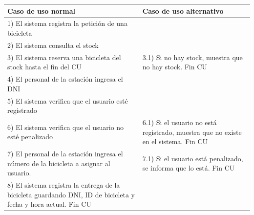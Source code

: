 \documentclass[a4paper, 10pt, twoside]{article}
\begin{document}
\begin{tabular}{| p{7cm} | p{7cm} |}
	\hline
	Caso de uso normal & Caso de uso alternativo \\ \hline
	1) El sistema registra la petición de una bicicleta &  \\ \hline
	2) El sistema consulta el stock & \\ \hline
	3) El sistema reserva una bicicleta del stock hasta el fin del CU & 3.1) Si no hay stock, muestra que no hay stock. Fin CU \\ \hline
	4) El personal de la estación ingresa el DNI & \\ \hline
	5) El sistema verifica que el usuario esté registrado & \\ \hline
	6) El sistema verifica que el usuario no esté penalizado & 6.1) Si el usuario no está registrado, muestra que no existe en el sistema. Fin CU \\ \hline
	7) El personal de la estación ingresa el número de la bicicleta a asignar al usuario. & 7.1) Si el usuario está penalizado, se informa que lo está. Fin CU \\ \hline
	8) El sistema registra la entrega de la bicicleta guardando DNI, ID de bicicleta y fecha y hora actual. Fin CU & \\
	\hline
\end{tabular}
\end{document}
